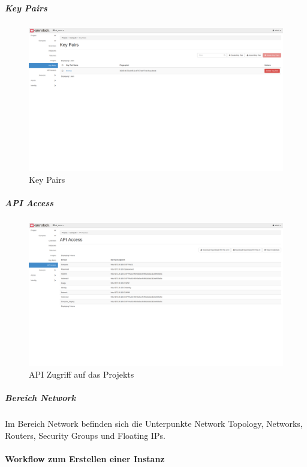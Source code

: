 \documentclass[a4paper,10pt]{article}
\begin{document}
\subparagraph{Key Pairs}

\begin{figure}[htbp]
\centering
\caption{Key Pairs}
\label{fig:devstack:key_pairs}
\includegraphics[width=\textwidth, trim={0 17cm 0 0}, clip]{graphics/devstack/03_KeyPairs}
\end{figure}

\subparagraph{API Access}

\begin{figure}[htbp]
\centering
\caption{API Zugriff auf das Projekts}
\label{fig:devstack:api_access}
\includegraphics[width=\textwidth, trim={0 10cm 0 0}, clip]{graphics/devstack/04_ApiAccess}
\end{figure}

\subparagraph{Bereich Network}

Im Bereich Network befinden sich die Unterpunkte Network Topology, Networks, Routers, Security Groups und Floating IPs.

\paragraph{Workflow zum Erstellen einer Instanz}
\end{document}
